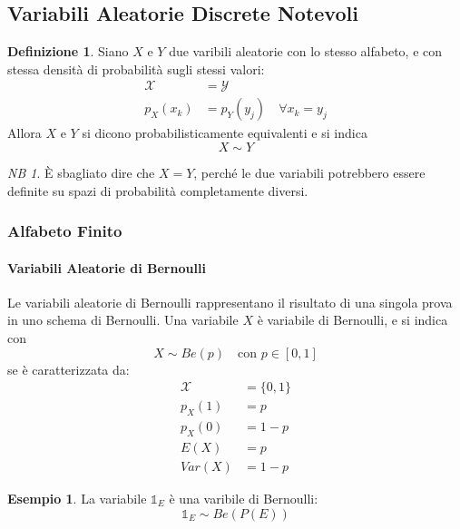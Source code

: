 \documentclass{article}
\theoremstyle{plain}
\theoremstyle{definition}
\newtheorem{definizione}{Definizione}[section]
\newtheorem{esempio}{Esempio}[section]
\theoremstyle{remark}
\newtheorem*{NB}{NB}
\begin{document}
\subsection{Variabili Aleatorie Discrete Notevoli} %
\label{sub:variabili_aleatorie_discrete_notevoli}
\begin{definizione}
	Siano $X$ e $Y$ due varibili aleatorie con lo stesso alfabeto, e con stessa densità di probabilità sugli stessi valori:
	\begin{align*}
		\mathcal{X}&=\mathcal{Y}\\
		p_X(x_k)&=p_Y(y_j)\quad\forall x_k=y_j
	\end{align*}
	Allora $X$ e $Y$ si dicono probabilisticamente equivalenti e si indica
	\begin{equation*}
		X\sim Y
	\end{equation*}
\end{definizione}
\begin{NB}
	È sbagliato dire che $X=Y$, perché le due variabili potrebbero essere definite su spazi di probabilità completamente diversi.
\end{NB}
\subsubsection{Alfabeto Finito} %
\label{ssub:alfabeto_finito}
\paragraph{Variabili Aleatorie di Bernoulli} %
\label{par:variabili_aleatorie_di_bernoulli}
Le variabili aleatorie di Bernoulli rappresentano il risultato di una singola prova in uno schema di Bernoulli. Una variabile $X$ è variabile di Bernoulli, e si indica con
\begin{equation*}
	X\sim Be(p)\quad\text{con }p\in[0,1]
\end{equation*}
se è caratterizzata da:
\begin{align*}
	\mathcal{X}&=\{0,1\}\\
	p_X(1)&=p\\
	p_X(0)&=1-p\\
	E(X)&=p\\
	Var(X)&=1-p
\end{align*}
\begin{esempio}
	La variabile $\mathds{1}_E$ è una varibile di Bernoulli:
	\begin{equation*}
		\mathds{1}_E\sim Be(P(E))
	\end{equation*}
\end{esempio}
\end{document}
